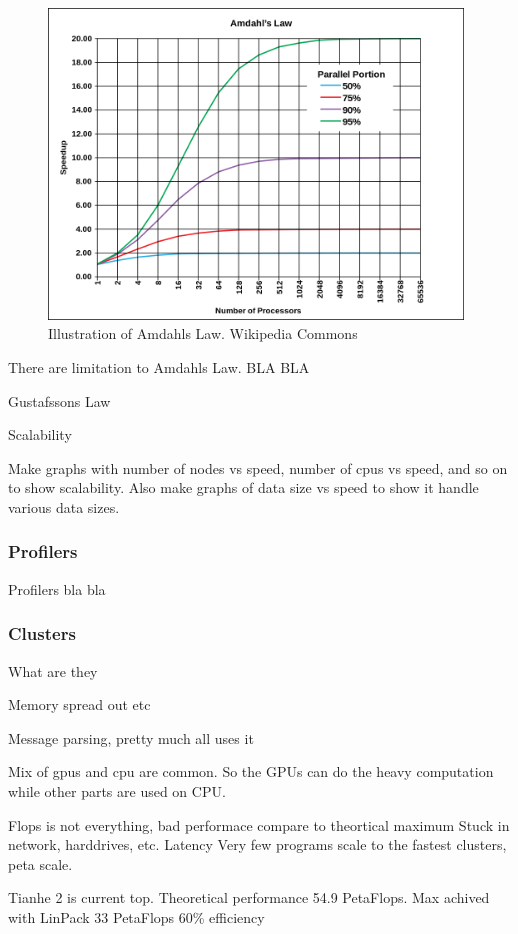 \documentclass[10pt,a4paper]{article}
\begin{document}
\begin{figure}[h]
    \centering
    \includegraphics[width=11cm]{AmdahlsLaw.png}
    \caption{Illustration of Amdahls Law. Wikipedia Commons}
    \label{fig:AmdahlsLaw}
\end{figure}

There are limitation to Amdahls Law. BLA BLA

Gustafssons Law

Scalability

Make graphs with number of nodes vs speed, number of cpus vs speed, and so on to show scalability. Also make graphs of data size vs speed to show it handle various data sizes.

\subsubsection{Profilers}
Profilers bla bla

\subsubsection{Clusters}
What are they

Memory spread out etc

Message parsing, pretty much all uses it

Mix of gpus and cpu are common. So the GPUs can do the heavy computation while other parts are used on CPU.

Flops is not everything, bad performace compare to theortical maximum
Stuck in network, harddrives, etc. Latency
Very few programs scale to the fastest clusters, peta scale.

Tianhe 2 is current top. Theoretical performance 54.9 PetaFlops.
Max achived with LinPack 33 PetaFlops
60\% efficiency
\end{document}
